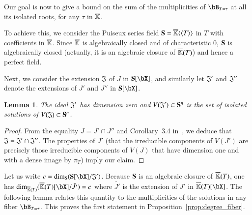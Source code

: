 \documentclass[amsthm]{elsart}
\newtheorem{lemma}[definition]{Lemma}
\begin{document}
Our goal is now to give a bound on the sum of the multiplicities of
$\bB_{T=\tau}$ at all its isolated roots, for any $\tau$ in $\overline{\mathbb{K}}$.

To achieve this, we consider the Puiseux series field
$\mathbf{S} = \overline{\mathbb{K}}\langle \langle T\rangle \rangle$ in $T$ with
coefficients in $\overline{\mathbb{K}}$.  Since $\overline{\mathbb{K}}$ is algebraically closed and
of characteristic $0$, $\mathbf{S}$ is algebraically closed (actually, it is
an algebraic closure of $\overline{\mathbb{K}}(T)$) and hence a perfect field.

Next, we consider the extension $\frak{J}$ of $J$ in $\SS[\bX]$, and
similarly let $\frak{J}'$ and ${\frak J}''$ denote the extensions of $J'$ and
$J''$ in $\SS[\bX]$.

\begin{lemma}\label{lemma:dimJprime}
  The ideal $\frak{J}'$ has dimension zero and $V(\frak{J}') \subset
  \mathbf{S}^n$ is the set of isolated solutions of
  $V(\frak{J}) \subset \mathbf{S}^n$.
\end{lemma}
\begin{proof}
 From the equality $J=J' \cap J''$ and Corollary~3.4 in~\cite{AtMc},
 we deduce that $\frak{J}=\frak{J'} \cap \frak{J''}$. The properties
 of $J'$ (that the irreducible components of $V(J')$ are precisely those
 irreducible components of $V(J)$ that have dimension one and with a
 dense image by $\pi_T$) imply our claim.
\end{proof}


Let us write $c=\dim_{\SS}(\SS[\bX]/{\frak J}')$. Because $\mathbf{S}$ is an
algebraic closure of $\overline{\mathbb{K}}(T)$, one has $\dim_{\KKbar(T)} (
\KKbar(T)[\bX]/\tilde{J'} ) = c$ where $\tilde{J'}$ is the extension
of $J'$ in $\KKbar(T)[\bX]$. The following lemma relates this
quantity to the multiplicities of the solutions in any fiber
$\bB_{T=\tau}$. This proves the first statement in
Proposition~\ref{prop:degree_fiber}.
\end{document}
